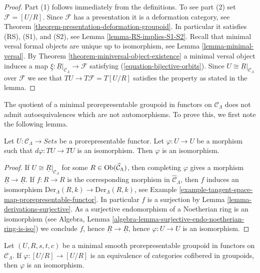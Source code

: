 \begin{proof}
Part (1) follows immediately from the definitions.
To see part (2) set $\mathcal{F} = [U/R]$. Since $\mathcal{F}$
has a presentation it is a deformation category, see
Theorem \ref{theorem-presentation-deformation-groupoid}.
In particular it satisfies (RS), (S1), and (S2), see
Lemma \ref{lemma-RS-implies-S1-S2}.
Recall that minimal versal formal objects are unique up to isomorphism, see
Lemma \ref{lemma-minimal-versal}.
By
Theorem \ref{theorem-miniversal-object-existence}
a minimal versal object induces a map
$\underline{\xi} : \underline{R}|_{\mathcal{C}_\Lambda} \to \mathcal{F}$
satisfying (\ref{equation-bijective-orbits}). Since
$U \cong \underline{R}|_{\mathcal{C}_\Lambda}$ over $\mathcal{F}$
we see that $TU \to T\mathcal{F} = T[U/R]$ satisfies the property
as stated in the lemma.
\end{proof}

\noindent
The quotient of a minimal prorepresentable groupoid in functors on $\mathcal
C_\Lambda$ does not admit autoequivalences which are not automorphisms.  To
prove this, we first note the following lemma.

\begin{lemma}
\label{lemma-surjective-morphism-prorepresentable-functor}
Let $U: \mathcal{C}_\Lambda \to \textit{Sets}$ be a
prorepresentable functor. Let $\varphi: U \to U$ be a morphism such
that $d\varphi: TU \to TU$ is an isomorphism.  Then $\varphi$ is an
isomorphism.
\end{lemma}

\begin{proof}
If $U \cong \underline{R}|_{\mathcal{C}_\Lambda}$ for some
$R \in \mathop{\rm Ob}\nolimits(\widehat{\mathcal{C}}_\Lambda)$,
then completing $\varphi$ gives a morphism $\underline{R} \to \underline{R}$.
If $f: R \to R$ is the corresponding morphism in
$\widehat{\mathcal{C}}_\Lambda$, then $f$ induces an isomorphism
$\text{Der}_\Lambda(R, k) \to \text{Der}_\Lambda(R, k)$, see
Example \ref{example-tangent-space-map-prorepresentable-functor}.
In particular $f$ is a surjection by
Lemma \ref{lemma-derivations-surjective}.
As a surjective endomorphism of a Noetherian ring is an isomorphism (see
Algebra, Lemma \ref{algebra-lemma-surjective-endo-noetherian-ring-is-iso})
we conclude $f$, hence $\underline{R}
\to \underline{R}$, hence $\varphi : U \to U$
is an isomorphism.
\end{proof}

\begin{lemma}
\label{lemma-minimal-prorepresentable-groupoid-autoequivalence}
Let $(U, R, s, t, c)$ be a minimal smooth prorepresentable groupoid in
functors on $\mathcal{C}_\Lambda$. If $\varphi: [U/R] \to [U/R]$ is an
equivalence of categories cofibered in groupoids, then $\varphi$ is an
isomorphism.
\end{lemma}

